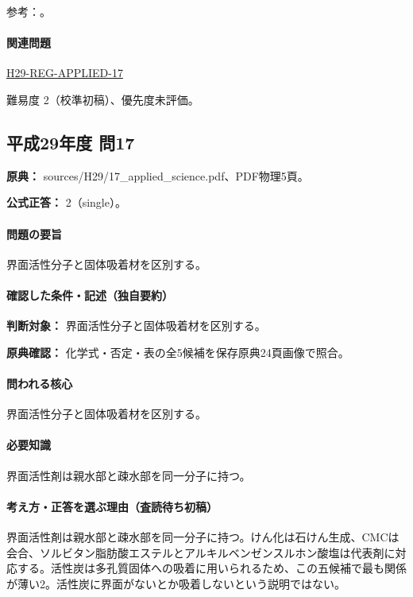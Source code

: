 \par 参考：\cite{organic_cmc}。

\paragraph{関連問題} \hyperref[q:h29-reg-applied-17]{H29-REG-APPLIED-17}

\par 難易度 2（校準初稿）、優先度未評価。

\subsection{平成29年度 問17}
\label{q:h29-reg-applied-17}

\noindent\textbf{原典：} sources/H29/17\_applied\_science.pdf、PDF物理5頁。

\textbf{公式正答：} 2（single）。

\paragraph{問題の要旨} 界面活性分子と固体吸着材を区別する。

\paragraph{確認した条件・記述（独自要約）}\mbox{}\par

\noindent\textbf{判断対象：} 界面活性分子と固体吸着材を区別する。\par

\noindent\textbf{原典確認：} 化学式・否定・表の全5候補を保存原典24頁画像で照合。\par

\paragraph{問われる核心} 界面活性分子と固体吸着材を区別する。

\paragraph{必要知識} 界面活性剤は親水部と疎水部を同一分子に持つ。

\paragraph{考え方・正答を選ぶ理由（査読待ち初稿）} 界面活性剤は親水部と疎水部を同一分子に持つ。けん化は石けん生成、CMCは会合、ソルビタン脂肪酸エステルとアルキルベンゼンスルホン酸塩は代表剤に対応する。活性炭は多孔質固体への吸着に用いられるため、この五候補で最も関係が薄い2。活性炭に界面がないとか吸着しないという説明ではない。

